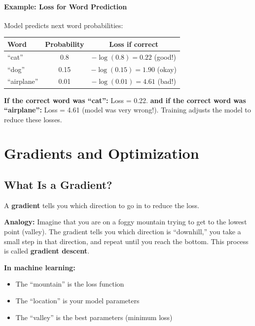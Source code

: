\begin{chapterenv}
\paragraph{Example: Loss for Word Prediction}

Model predicts next word probabilities:

\begin{center}
\begin{tabular}{lcc}
\toprule
\textbf{Word} & \textbf{Probability} & \textbf{Loss if correct} \\
\midrule
``cat'' & 0.8 & $-\log(0.8) = 0.22$ (good!) \\
``dog'' & 0.15 & $-\log(0.15) = 1.90$ (okay) \\
``airplane'' & 0.01 & $-\log(0.01) = 4.61$ (bad!) \\
\bottomrule
\end{tabular}
\end{center}

\textbf{If the correct word was ``cat'':} Loss = 0.22. \textbf{and if the correct word was ``airplane'':} Loss = 4.61 (model was very wrong!). Training adjusts the model to reduce these losses.

\section{Gradients and Optimization}

\subsection{What Is a Gradient?}

A \textbf{gradient} tells you which direction to go in to reduce the loss.

\textbf{Analogy:} Imagine that you are on a foggy mountain trying to get to the lowest point (valley). The gradient tells you which direction is ``downhill,'' you take a small step in that direction, and repeat until you reach the bottom. This process is called \textbf{gradient descent}.

\textbf{In machine learning:}
\begin{itemize}[nosep]
    \item The ``mountain'' is the loss function
    \item The ``location'' is your model parameters
    \item The ``valley'' is the best parameters (minimum loss)
\end{itemize}


\end{chapterenv}

